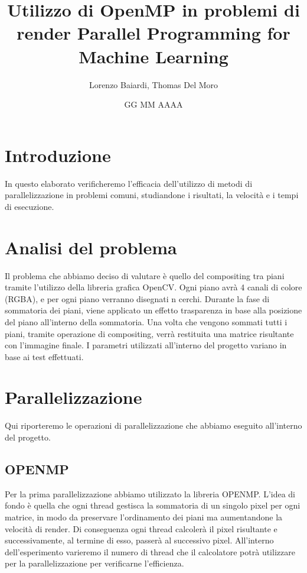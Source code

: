 \documentclass[11pt]{article}
\title{Utilizzo di OpenMP in problemi di render
Parallel Programming for Machine Learning}
\author{Lorenzo Baiardi, Thomas Del Moro}
\date{GG MM AAAA}
\begin{document}
    \maketitle
        \clearpage

    \tableofcontents
        \clearpage

    \section{Introduzione}\label{sec:introduzione}
        In questo elaborato verificheremo l'efficacia dell'utilizzo di metodi di parallelizzazione in problemi comuni,
        studiandone i risultati, la velocità e i tempi di esecuzione.
        \clearpage

    \section{Analisi del problema}\label{sec:analisi-del-problema}
        Il problema che abbiamo deciso di valutare è quello del compositing tra piani tramite l'utilizzo della libreria
        grafica OpenCV\@.
        Ogni piano avrà 4 canali di colore (RGBA), e per ogni piano verranno disegnati n cerchi.
        Durante la fase di sommatoria dei piani, viene applicato un effetto trasparenza in base alla posizione del piano
        all'interno della sommatoria.
        Una volta che vengono sommati tutti i piani, tramite operazione di compositing, verrà restituita una matrice
        risultante con l'immagine finale.
        I parametri utilizzati all'interno del progetto variano in base ai test effettuati.
        \clearpage

    \section{Parallelizzazione}\label{sec:parallelizazzione}
        Qui riporteremo le operazioni di parallelizzazione che abbiamo eseguito all'interno del progetto.

        \subsection{OPENMP}\label{subsec:openmp}
            Per la prima parallelizzazione abbiamo utilizzato la libreria OPENMP\@.
            L'idea di fondo è quella che ogni thread gestisca la sommatoria di un singolo pixel per ogni matrice, in
            modo da preservare l'ordinamento dei piani ma aumentandone la velocità di render.
            Di conseguenza ogni thread calcolerà il pixel risultante e successivamente, al termine di esso, passerà
            al successivo pixel.
            All'interno dell'esperimento varieremo il numero di thread che il calcolatore potrà utilizzare per la
            parallelizzazione per verificarne l'efficienza.
\end{document}
